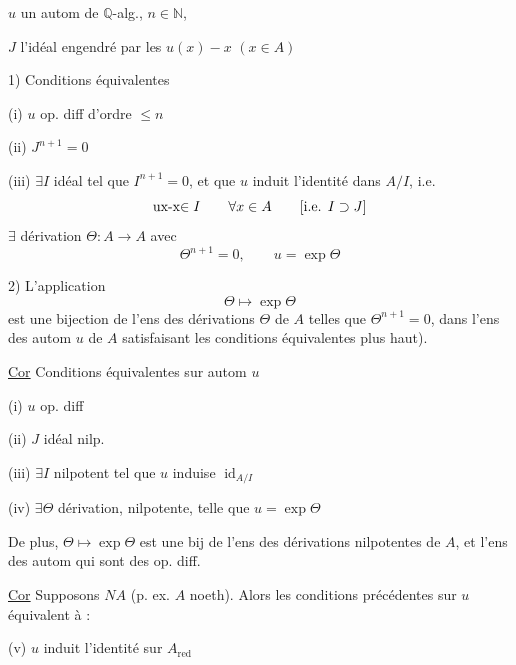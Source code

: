 $u$ un autom de $\mathbb{Q}$-alg., $n\in\mathbb{N}$,

$J$ l'idéal engendré par les $u(x)-x$ $(x\in A)$

1) Conditions équivalentes

(i) $u$ op. diff d'ordre $\leq n$

(ii) $J^{n+1}=0$

(iii) $\exists I$ idéal  tel que $I^{n+1}=0$, et que $u$ induit l'identité dans $A/I$, i.e.
\[
\uline{$ux-x$}\in I\qquad\forall x\in A\qquad[\text{i.e. }I\supset J]
\]
 
$\exists$ dérivation $\Theta:A\longrightarrow A$ avec
\[
\Theta^{n+1}=0,\qquad u=\exp\Theta
\]


2) L'application
\[
\Theta\longmapsto\exp\Theta
\]
est une bijection de l'ens des dérivations $\Theta$ de $A$ telles que $\Theta^{n+1}=0$, dans l'ens des autom $u$ de $A$  satisfaisant les conditions équivalentes plus haut).

\uline{Cor} Conditions équivalentes sur autom $u$

(i) $u$ op. diff

(ii) $J$ idéal nilp.

(iii) $\exists I$ nilpotent tel que $u$ induise $\operatorname{id}_{A/I}$

(iv) $\exists\Theta$ dérivation, nilpotente, telle que $u=\exp\Theta$

De plus, $\Theta\longmapsto\exp\Theta$ est une bij de l'ens des dérivations nilpotentes de $A$, et l'ens des autom  qui sont des op. diff.

\uline{Cor}  Supposons $NA$  (p. ex. $A$ noeth). Alors les conditions précédentes sur $u$ équivalent à :

(v) $u$ induit l'identité sur $A_{\mathrm{red}}$

